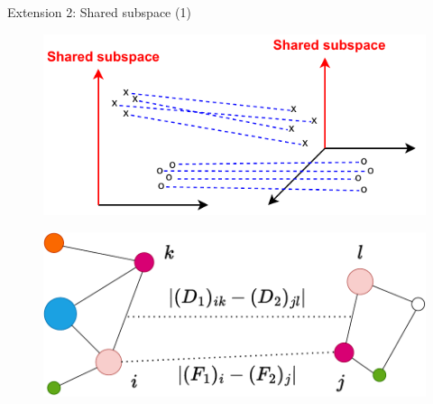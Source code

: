 \documentclass{beamer}
\begin{document}
\begin{frame}{Extension 2: Shared subspace (1)}
  \begin{figure}
    \centering
    \includegraphics[width=0.8\linewidth, keepaspectratio=true]{OT_new/fgw_abstract.pdf}
  \end{figure}

  \begin{figure}
    \centering
    \includegraphics[width=0.8\linewidth, keepaspectratio=true]{OT_new/fgw.pdf}
  \end{figure}
\end{frame}
\end{document}
